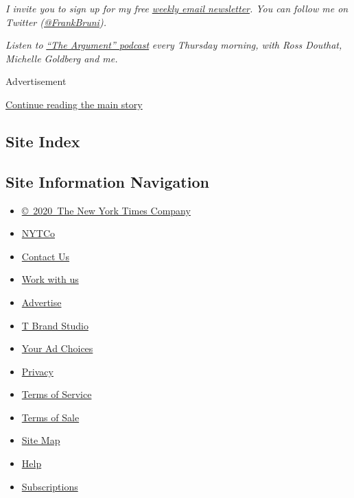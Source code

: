 \emph{I invite you to sign up for my free}
\href{https://www.nytimes3xbfgragh.onion/newsletters/frank-bruni}{\emph{weekly
email newsletter}}\emph{. You can follow me on Twitter
(}\href{https://twitter.com/FrankBruni}{\emph{@FrankBruni}}\emph{).}

\emph{Listen to}
\href{https://www.nytimes3xbfgragh.onion/column/the-argument}{\emph{``The
Argument'' podcast}} \emph{every Thursday morning, with Ross Douthat,
Michelle Goldberg and me.}

Advertisement

\protect\hyperlink{after-bottom}{Continue reading the main story}

\hypertarget{site-index}{%
\subsection{Site Index}\label{site-index}}

\hypertarget{site-information-navigation}{%
\subsection{Site Information
Navigation}\label{site-information-navigation}}

\begin{itemize}
\tightlist
\item
  \href{https://help.nytimes3xbfgragh.onion/hc/en-us/articles/115014792127-Copyright-notice}{©~2020~The
  New York Times Company}
\end{itemize}

\begin{itemize}
\tightlist
\item
  \href{https://www.nytco.com/}{NYTCo}
\item
  \href{https://help.nytimes3xbfgragh.onion/hc/en-us/articles/115015385887-Contact-Us}{Contact
  Us}
\item
  \href{https://www.nytco.com/careers/}{Work with us}
\item
  \href{https://nytmediakit.com/}{Advertise}
\item
  \href{http://www.tbrandstudio.com/}{T Brand Studio}
\item
  \href{https://www.nytimes3xbfgragh.onion/privacy/cookie-policy\#how-do-i-manage-trackers}{Your
  Ad Choices}
\item
  \href{https://www.nytimes3xbfgragh.onion/privacy}{Privacy}
\item
  \href{https://help.nytimes3xbfgragh.onion/hc/en-us/articles/115014893428-Terms-of-service}{Terms
  of Service}
\item
  \href{https://help.nytimes3xbfgragh.onion/hc/en-us/articles/115014893968-Terms-of-sale}{Terms
  of Sale}
\item
  \href{https://spiderbites.nytimes3xbfgragh.onion}{Site Map}
\item
  \href{https://help.nytimes3xbfgragh.onion/hc/en-us}{Help}
\item
  \href{https://www.nytimes3xbfgragh.onion/subscription?campaignId=37WXW}{Subscriptions}
\end{itemize}
